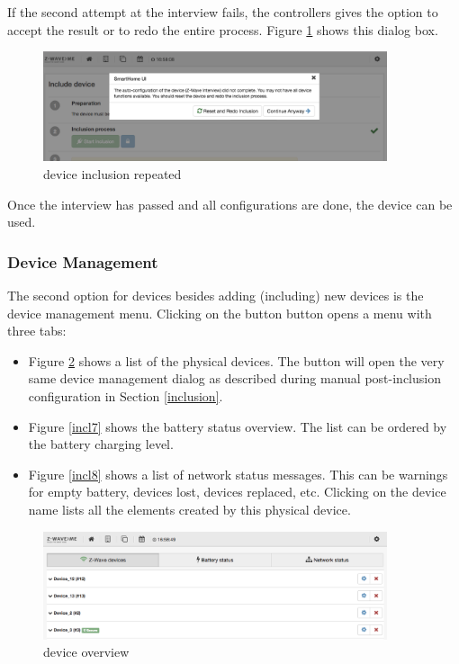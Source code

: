 If the second attempt at the interview fails, the controllers gives the option to 
accept the result or to redo the entire process. Figure \ref{incl5} shows this dialog box.

\begin{figure}
\begin{center}
\includegraphics[width=0.9\textwidth]{pngs/cap4/incl5.png}
\caption{\zwave device inclusion repeated}
\label{incl5}
\end{center}
\end{figure}

Once the interview has passed and all configurations are done, the device can be used.

\subsubsection{\zwave Device Management}

The second option for \zwave devices besides adding (including) new devices is the device 
management menu. Clicking on the button  button opens a menu with three tabs:

\begin{itemize}
\item Figure \ref{incl6} shows a list of the physical \zwave devices. The \keystroke{*} button 
will open the very same device management dialog as described during manual post-inclusion 
configuration in Section \ref{inclusion}.
\item Figure \ref{incl7} shows the battery status overview. The list can be ordered by 
the battery charging level.
\item Figure \ref{incl8} shows a list of network status messages. This can be warnings 
for empty battery, devices lost, devices replaced, etc. Clicking on the device name 
lists all the elements created by this physical device.
\end{itemize}


\begin{figure}
\begin{center}
\includegraphics[width=0.9\textwidth]{pngs/cap4/incl6.png}
\caption{\zwave device overview}
\label{incl6}
\end{center}
\end{figure}

